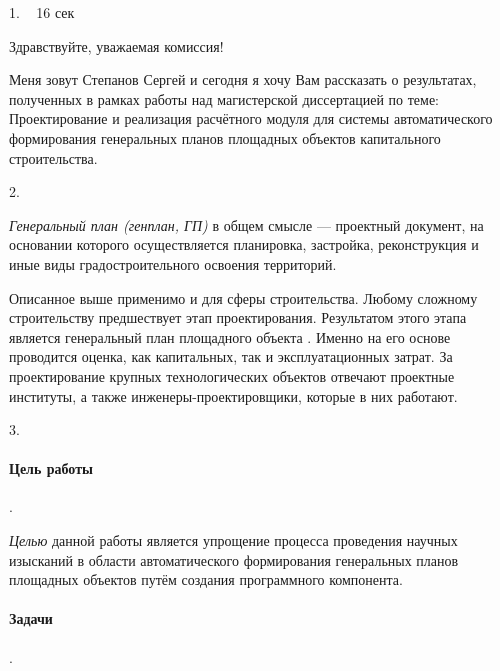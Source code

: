 \documentclass[11pt]{article}
\begin{document}
1. ~ 16 сек

Здравствуйте, уважаемая комиссия!

Меня зовут Степанов Сергей и сегодня я хочу Вам рассказать о результатах,
полученных в рамках работы над магистерской диссертацией по теме:
Проектирование и реализация расчётного модуля для системы автоматического формирования
генеральных планов площадных объектов капитального строительства.


2.

\textit{Генеральный план (генплан, ГП)} в общем смысле —
проектный документ, на основании которого осуществляется планировка,
застройка, реконструкция и иные виды градостроительного освоения территорий.

Описанное выше применимо и для сферы строительства.
Любому сложному строительству предшествует этап проектирования.
Результатом этого этапа является генеральный план площадного объекта .
Именно на его основе проводится оценка, как капитальных, так и эксплуатационных затрат.
За проектирование крупных технологических объектов отвечают проектные институты,
а также инженеры-проектировщики, которые в них работают.


3.


\paragraph{Цель работы}.

\textit{Целью} данной работы является
упрощение процесса проведения научных изысканий
в области автоматического формирования генеральных планов площадных объектов
путём создания программного компонента.

\paragraph{Задачи}.
\end{document}
